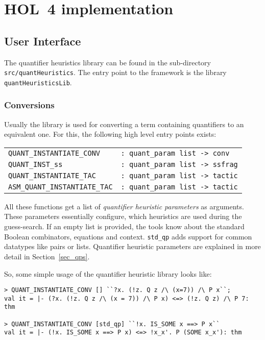 \documentclass[a4paper,12pt,DIV=12,oneside]{scrbook}
\theoremstyle{definition}
\theoremstyle{remark}
\begin{document}
\chapter{HOL~4 implementation}

\section{User Interface}\label{sec_interface}

The quantifier heuristics library can be found in the sub-directory
\texttt{src/quantHeuristics}.  The entry point to the framework is the
library \texttt{quantHeuristicsLib}.

\subsection{Conversions}
Usually the library is used for
converting a term containing quantifiers to an equivalent one. For this,
the following high level entry points exists:
\bigskip

\noindent
\begin{tabular}{@{}ll}
\texttt{QUANT\_INSTANTIATE\_CONV} & \texttt{: quant\_param list -> conv} \\
\texttt{QUANT\_INST\_ss} & \texttt{: quant\_param list -> ssfrag} \\
\texttt{QUANT\_INSTANTIATE\_TAC} & \texttt{: quant\_param list -> tactic} \\
\texttt{ASM\_QUANT\_INSTANTIATE\_TAC} & \texttt{: quant\_param list -> tactic}
\end{tabular}
\bigskip

All these functions get a list of \emph{quantifier heuristic parameters} as arguments. These
parameters essentially configure, which heuristics are used during the guess-search. If
an empty list is provided, the tools know about the standard Boolean combinators, equations and context.
\texttt{std\_qp} adds support for common datatypes like pairs or lists.
Quantifier heuristic parameters are explained in more detail in
Section~\ref{sec_qps}.

So, some simple usage of the quantifier heuristic library looks like:
{\scriptsize
\begin{verbatim}
> QUANT_INSTANTIATE_CONV [] ``?x. (!z. Q z /\ (x=7)) /\ P x``;
val it = |- (?x. (!z. Q z /\ (x = 7)) /\ P x) <=> (!z. Q z) /\ P 7: thm

> QUANT_INSTANTIATE_CONV [std_qp] ``!x. IS_SOME x ==> P x``
val it = |- (!x. IS_SOME x ==> P x) <=> !x_x'. P (SOME x_x'): thm
\end{verbatim}}
\end{document}
